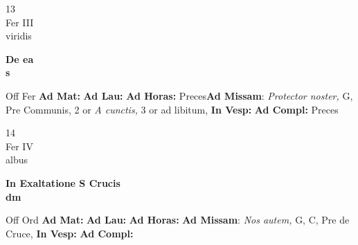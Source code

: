 \documentclass[10pt, openany]{book}
\begin{document}
        \begin{center}
            \begin{minipage}{3.5in}
                \vspace{2em}
                \begin{minipage}{0.5in}
                    {\Huge 13} \\
                    {\normalsize Fer III} \\
                    {\normalsize viridis}
                \end{minipage}
                \begin{minipage}{3.0in}
                    \textbf{ \large De ea \\
                    \textnormal{\normalsize s}} \\ 
                \end{minipage}
                \begin{justify}Off Fer
                    \textbf{Ad Mat: }
                    \textbf{Ad Lau: }
                    \textbf{Ad Horas: }Preces\textbf{Ad Missam}: \textit{Protector noster,} G, Pre Communis, 2 or \textit{A cunctis,} 3 or ad libitum,  
                    \textbf{In Vesp: }
                    \textbf{Ad Compl: }Preces
                \end{justify}
            \end{minipage}
        \end{center}
    
        \begin{center}
            \begin{minipage}{3.5in}
                \vspace{2em}
                \begin{minipage}{0.5in}
                    {\Huge 14} \\
                    {\normalsize Fer IV} \\
                    {\normalsize albus}
                \end{minipage}
                \begin{minipage}{3.0in}
                    \textbf{ \large In Exaltatione S Crucis \\
                    \textnormal{\normalsize dm}} \\ 
                \end{minipage}
                \begin{justify}Off Ord
                    \textbf{Ad Mat: }
                    \textbf{Ad Lau: }
                    \textbf{Ad Horas: }\textbf{Ad Missam}: \textit{Nos autem,} G, C, Pre de Cruce,  
                    \textbf{In Vesp: }
                    \textbf{Ad Compl: }
                \end{justify}
            \end{minipage}
        \end{center}
    
\end{document}
